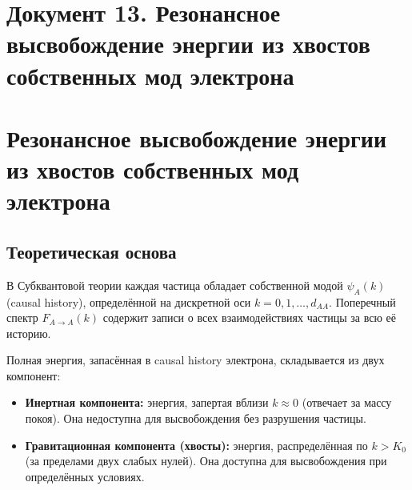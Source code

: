 \documentclass[12pt,a4paper]{article}
\begin{document}

\newpage
\section*{Документ 13. Резонансное высвобождение энергии из хвостов собственных мод электрона}

\section{Резонансное высвобождение энергии из хвостов собственных мод электрона}

\begin{abstract}
В рамках Субквантовой теории предсказывается, что собственная мода электрона содержит запасённую энергию в виде хвостов causal history. При воздействии резонансного поля, инвертирующего фазу causal history, эта энергия может быть частично высвобождена. Теоретическая оценка даёт коэффициент усиления по энергии около $4$ ($400\%$ от затраченной). Предлагается эксперимент по проверке этого предсказания с использованием одного электрона в вакуумной камере с перестраиваемым электромагнитным полем.
\end{abstract}

\subsection{Теоретическая основа}
В Субквантовой теории каждая частица обладает собственной модой $\psi_A(k)$ (causal history), определённой на дискретной оси $k = 0, 1, \dots, d_{AA}$. Поперечный спектр $F_{A \to A}(k)$ содержит записи о всех взаимодействиях частицы за всю её историю.

Полная энергия, запасённая в causal history электрона, складывается из двух компонент:
\begin{itemize}
    \item \textbf{Инертная компонента:} энергия, запертая вблизи $k \approx 0$ (отвечает за массу покоя). Она недоступна для высвобождения без разрушения частицы.
    \item \textbf{Гравитационная компонента (хвосты):} энергия, распределённая по $k > K_0$ (за пределами двух слабых нулей). Она доступна для высвобождения при определённых условиях.
\end{itemize}
\end{document}
